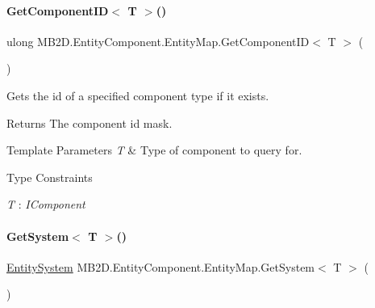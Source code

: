 \paragraph{\texorpdfstring{Get\+Component\+I\+D$<$ T $>$()}{GetComponentID< T >()}}
{\footnotesize\ttfamily ulong M\+B2\+D.\+Entity\+Component.\+Entity\+Map.\+Get\+Component\+ID$<$ T $>$ (\begin{DoxyParamCaption}{ }\end{DoxyParamCaption})\hspace{0.3cm}{\ttfamily [inline]}}



Gets the id of a specified component type if it exists. 

\begin{DoxyReturn}{Returns}
The component id mask.
\end{DoxyReturn}

\begin{DoxyTemplParams}{Template Parameters}
{\em T} & Type of component to query for.\\
\hline
\end{DoxyTemplParams}
\begin{Desc}
\item[Type Constraints]\begin{description}
\item[{\em T} : {\em I\+Component}]\end{description}
\end{Desc}
\hypertarget{class_m_b2_d_1_1_entity_component_1_1_entity_map_a1240739b3c9be7daeebd2a0ae3cc04ff}{}\label{class_m_b2_d_1_1_entity_component_1_1_entity_map_a1240739b3c9be7daeebd2a0ae3cc04ff} 
\paragraph{\texorpdfstring{Get\+System$<$ T $>$()}{GetSystem< T >()}}
{\footnotesize\ttfamily \hyperlink{class_m_b2_d_1_1_entity_component_1_1_entity_system}{Entity\+System} M\+B2\+D.\+Entity\+Component.\+Entity\+Map.\+Get\+System$<$ T $>$ (\begin{DoxyParamCaption}{ }\end{DoxyParamCaption})\hspace{0.3cm}{\ttfamily [inline]}}



